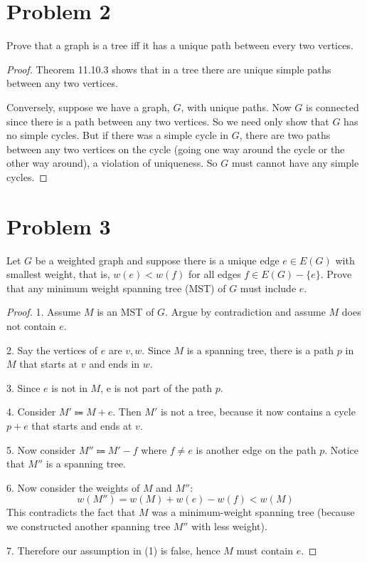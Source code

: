 \documentclass[14pt]{extarticle}
\begin{document}
\section{Problem 2}
Prove that a graph is a tree iff it has a unique path between every two vertices.

\begin{proof}
Theorem 11.10.3 shows that in a tree there are unique simple paths between any two vertices.

Conversely, suppose we have a graph, $G$, with unique paths. Now $G$ is connected since there is a path between any two vertices. So we need only show that $G$ has no simple cycles. But if there was a simple cycle in $G$, there are two paths between any two vertices on the cycle (going one way around the cycle or the other way around), a violation of uniqueness. So $G$ must cannot have any simple cycles.
\end{proof}

\section{Problem 3}
Let $G$ be a weighted graph and suppose there is a unique edge $e \in E(G)$ with smallest weight, that is, $w(e) < w(f)$ for all edges $f \in E(G) - \{e\}$. Prove that any minimum weight spanning tree (MST) of $G$ must include $e$.

\begin{proof}
1. Assume $M$ is an MST of $G$. Argue by contradiction and assume $M$ does not contain $e$.

2. Say the vertices of $e$ are $v, w$. Since $M$ is a spanning tree, there is a path $p$ in $M$ that starts at $v$ and ends in $w$.

3. Since $e$ is not in $M$, e is not part of the path $p$.

4. Consider $M' \Coloneqq M + e$. Then $M'$ is not a tree, because it now contains a cycle $p + e$ that starts and ends at $v$.

5. Now consider $M'' \Coloneqq M' - f$ where $f \neq e$ is another edge on the path $p$. Notice that $M''$ is a spanning tree.

6. Now consider the weights of $M$ and $M''$:
$$
w(M'') = w(M) + w(e) - w(f) < w(M)
$$
This contradicts the fact that $M$ was a minimum-weight spanning tree (because we constructed another spanning tree $M''$ with less weight).

7. Therefore our assumption in (1) is false, hence $M$ must contain $e$.
\end{proof}
\end{document}
